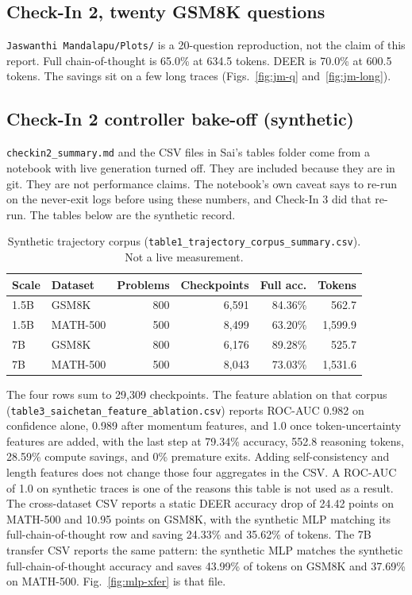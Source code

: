 \subsection{Check-In 2, twenty GSM8K questions}
\texttt{Jaswanthi Mandalapu/Plots/} is a 20-question reproduction, not the claim of this report.
Full chain-of-thought is 65.0\% at 634.5 tokens.
DEER is 70.0\% at 600.5 tokens.
The savings sit on a few long traces (Figs.~\ref{fig:jm-q} and~\ref{fig:jm-long}).

\subsection{Check-In 2 controller bake-off (synthetic)}
\texttt{checkin2\_summary.md} and the CSV files in Sai's tables folder come from a notebook with live generation turned off.
They are included because they are in git.
They are not performance claims.
The notebook's own caveat says to re-run on the never-exit logs before using these numbers, and Check-In 3 did that re-run.
The tables below are the synthetic record.

\begin{table}[!t]
\caption{Synthetic trajectory corpus (\texttt{table1\_trajectory\_corpus\_summary.csv}). Not a live measurement.}
\label{tab:synth-corpus}
\centering
\footnotesize
\begin{tabular}{@{}llrrrr@{}}
\toprule
Scale & Dataset & Problems & Checkpoints & Full acc. & Tokens \\
\midrule
1.5B & GSM8K & 800 & 6{,}591 & 84.36\% & 562.7 \\
1.5B & MATH-500 & 500 & 8{,}499 & 63.20\% & 1{,}599.9 \\
7B & GSM8K & 800 & 6{,}176 & 89.28\% & 525.7 \\
7B & MATH-500 & 500 & 8{,}043 & 73.03\% & 1{,}531.6 \\
\bottomrule
\end{tabular}
\end{table}

The four rows sum to 29{,}309 checkpoints.
The feature ablation on that corpus (\texttt{table3\_saichetan\_feature\_ablation.csv}) reports ROC-AUC 0.982 on confidence alone, 0.989 after momentum features, and 1.0 once token-uncertainty features are added, with the last step at 79.34\% accuracy, 552.8 reasoning tokens, 28.59\% compute savings, and 0\% premature exits.
Adding self-consistency and length features does not change those four aggregates in the CSV.
A ROC-AUC of 1.0 on synthetic traces is one of the reasons this table is not used as a result.
The cross-dataset CSV reports a static DEER accuracy drop of 24.42 points on MATH-500 and 10.95 points on GSM8K, with the synthetic MLP matching its full-chain-of-thought row and saving 24.33\% and 35.62\% of tokens.
The 7B transfer CSV reports the same pattern: the synthetic MLP matches the synthetic full-chain-of-thought accuracy and saves 43.99\% of tokens on GSM8K and 37.69\% on MATH-500.
Fig.~\ref{fig:mlp-xfer} is that file.

